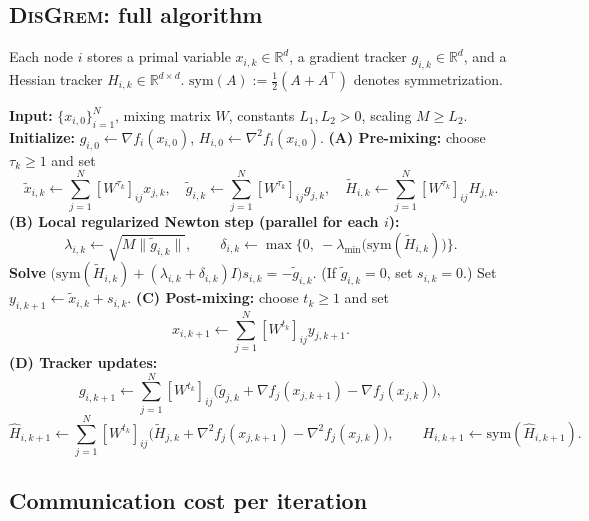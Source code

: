 \documentclass[11pt,a4paper]{article}
\newcommand{\R}{\mathbb{R}}
\begin{document}
	\subsection{\textsc{DisGrem}: full algorithm}\label{ssec:disgrem}
	
	Each node $i$ stores a primal variable $x_{i,k}\in\R^d$, a gradient tracker $g_{i,k}\in\R^d$,
	and a Hessian tracker $H_{i,k}\in\R^{d\times d}$.
	$\mathrm{sym}(A):=\tfrac12(A+A^\top)$ denotes symmetrization.
	
	\begin{algorithm}[H]
\caption{Decentralized Gradient--Regularized Newton (\textsc{DisGrem})}
\label{alg:disgrem}
\begin{algorithmic}[1]
\State \textbf{Input:} $\{x_{i,0}\}_{i=1}^N$, mixing matrix $W$, constants $L_1,L_2>0$, scaling $M\ge L_2$.
\State \textbf{Initialize:} $g_{i,0}\gets \nabla f_i(x_{i,0})$, $H_{i,0}\gets \nabla^2 f_i(x_{i,0})$.
\State \textbf{(A) Pre-mixing:} choose $\tau_k\ge1$ and set
\[
\tilde x_{i,k}\gets \sum_{j=1}^N [W^{\tau_k}]_{ij}x_{j,k},\quad
\tilde g_{i,k}\gets \sum_{j=1}^N [W^{\tau_k}]_{ij}g_{j,k},\quad
\tilde H_{i,k}\gets \sum_{j=1}^N [W^{\tau_k}]_{ij}H_{j,k}.
\]
\State \textbf{(B) Local regularized Newton step (parallel for each $i$):}
\[
\lambda_{i,k}\gets \sqrt{M\|\tilde g_{i,k}\|},\qquad
\delta_{i,k}\gets \max\!\Big\{0,\ -\lambda_{\min}\!\big(\mathrm{sym}(\tilde H_{i,k})\big)\Big\}.
\]
\Statex\hspace{1.6em}\textbf{Solve} $\big(\mathrm{sym}(\tilde H_{i,k})+(\lambda_{i,k}+\delta_{i,k})I\big)s_{i,k}=-\tilde g_{i,k}$.
\Statex\hspace{1.6em}(If $\tilde g_{i,k}=0$, set $s_{i,k}=0$.) Set $y_{i,k+1}\gets \tilde x_{i,k}+s_{i,k}$.
\State \textbf{(C) Post-mixing:} choose $t_k\ge1$ and set
\[
x_{i,k+1}\gets \sum_{j=1}^N [W^{t_k}]_{ij}y_{j,k+1}.
\]
\State \textbf{(D) Tracker updates:}
\[
g_{i,k+1}\gets \sum_{j=1}^N [W^{t_k}]_{ij}\Big(\tilde g_{j,k}+\nabla f_j(x_{j,k+1})-\nabla f_j(x_{j,k})\Big),
\]
\[
\widehat H_{i,k+1}\gets \sum_{j=1}^N [W^{t_k}]_{ij}\Big(\tilde H_{j,k}+\nabla^2 f_j(x_{j,k+1})-\nabla^2 f_j(x_{j,k})\Big),
\qquad
H_{i,k+1}\gets \mathrm{sym}(\widehat H_{i,k+1}).
\]
\EndFor
\end{algorithmic}
\end{algorithm}
	
\subsection{Communication cost per iteration}\label{ssec:comm}
\end{document}
